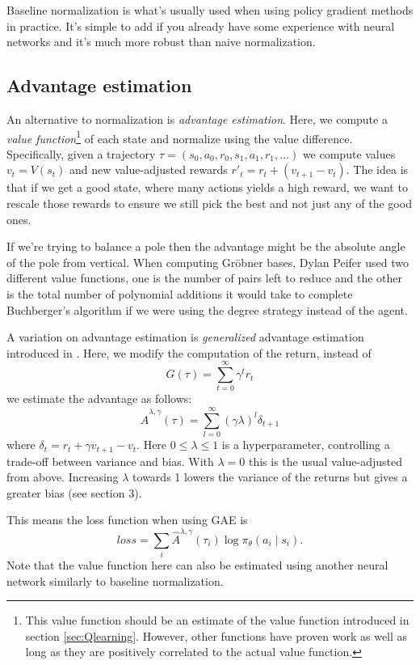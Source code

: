 \documentclass{article}
\theoremstyle{changedot}
\theoremstyle{changedotbreak}
\theoremstyle{nonumberplain}
\begin{document}
Baseline normalization is what's usually used when using policy gradient methods in practice. It's simple to add if you already have some experience with neural networks and it's much more robust than naive normalization.


\subsection{Advantage estimation} \label{ssec:AE}
An alternative to normalization is \emph{advantage estimation}. Here, we compute a \emph{value function}\footnote{This value function should be an estimate of the value function introduced in section \ref{sec:Qlearning}. However, other functions have proven work as well as long as they are positively correlated to the actual value function.} of each state and normalize using the value difference. Specifically, given a trajectory $\tau = (s_{0}, a_{0}, r_{0}, s_{1}, a_{1}, r_{1}, \dots)$ we compute values $v_{t} = V(s_{t})$ and new value-adjusted rewards $r'_{t} = r_{t} + (v_{t+1} - v_{t})$. The idea is that if we get a good state, where many actions yields a high reward, we want to rescale those rewards to ensure we still pick the best and not just any of the good ones.

If we're trying to balance a pole then the advantage might be the absolute angle of the pole from vertical. When computing Gröbner bases, Dylan Peifer used two different value functions, one is the number of pairs left to reduce and the other is the total number of polynomial additions it would take to complete Buchberger's algorithm if we were using the degree strategy instead of the agent.

A variation on advantage estimation is \emph{generalized} advantage estimation introduced in \cite{GAE}. Here, we modify the computation of the return, instead of \[G(\tau) = \sum_{t=0}^{\infty} \gamma^{t} r_{t}\] we estimate the advantage as follows: \[\hat A^{\lambda, \gamma}(\tau) = \sum_{l=0}^{\infty} (\gamma \lambda)^{l} \delta_{t+1}\] where $\delta_{t} = r_{t} + \gamma v_{t+1} - v_{t}$. Here $0 \leq \lambda \leq 1$ is a hyperparameter, controlling a trade-off between variance and bias. With $\lambda = 0$ this is the usual value-adjusted from above. Increasing $\lambda$ towards 1 lowers the variance of the returns but gives a greater bias (see \cite{GAE} section 3).

This means the loss function when using GAE is \[loss = \sum_{i} \hat A^{\lambda, \gamma}(\tau_{i}) \log \pi_{\theta}(a_{i} \mid s_{i}).\] Note that the value function here can also be estimated using another neural network similarly to baseline normalization.
\end{document}
